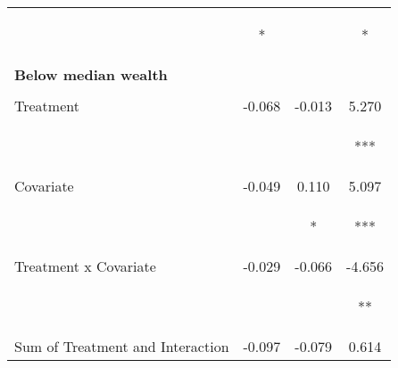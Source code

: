\begin{tabular}{lccc}
 & \begin{footnotesize}[0.042]*\end{footnotesize} & \begin{footnotesize}[0.035]\end{footnotesize} & \begin{footnotesize}[1.307]*\end{footnotesize}\\
\noalign{\smallskip}\textbf{Below median wealth} &  &  & \\
 & \begin{footnotesize}\end{footnotesize} & \begin{footnotesize}\end{footnotesize} & \begin{footnotesize}\end{footnotesize}\\
\noalign{\smallskip}Treatment & -0.068 & -0.013 & 5.270\\
 & \begin{footnotesize}[0.043]\end{footnotesize} & \begin{footnotesize}[0.037]\end{footnotesize} & \begin{footnotesize}[1.404]***\end{footnotesize}\\
\noalign{\smallskip}Covariate & -0.049 & 0.110 & 5.097\\
 & \begin{footnotesize}[0.070]\end{footnotesize} & \begin{footnotesize}[0.062]*\end{footnotesize} & \begin{footnotesize}[1.947]***\end{footnotesize}\\
\noalign{\smallskip}Treatment x Covariate & -0.029 & -0.066 & -4.656\\
 & \begin{footnotesize}[0.058]\end{footnotesize} & \begin{footnotesize}[0.049]\end{footnotesize} & \begin{footnotesize}[1.886]**\end{footnotesize}\\
\noalign{\smallskip}Sum of Treatment and Interaction & -0.097 & -0.079 & 0.614\\

\end{tabular}

